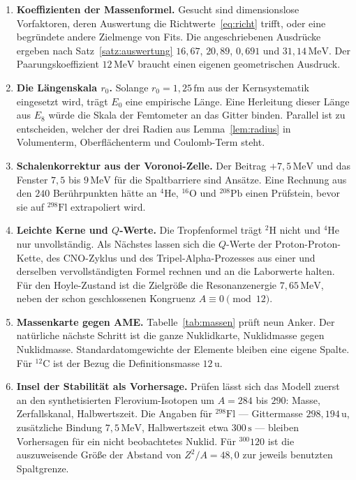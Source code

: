 \documentclass[11pt,a4paper]{article}
\theoremstyle{definition}
\theoremstyle{remark}
\newcommand{\Ee}{E_8}
\begin{document}
\begin{enumerate}
  \item \textbf{Koeffizienten der Massenformel.}
  Gesucht sind dimensionslose Vorfaktoren, deren Auswertung die Richtwerte~\eqref{eq:richt} trifft, oder eine begründete andere Zielmenge von Fits. Die angeschriebenen Ausdrücke ergeben nach Satz~\ref{satz:auswertung} \(16{,}67\), \(20{,}89\), \(0{,}691\) und \(31{,}14\,\mathrm{MeV}\). Der Paarungskoeffizient \(12\,\mathrm{MeV}\) braucht einen eigenen geometrischen Ausdruck.

  \item \textbf{Die Längenskala \(r_0\).}
  Solange \(r_0=1{,}25\,\mathrm{fm}\) aus der Kernsystematik eingesetzt wird, trägt \(E_0\) eine empirische Länge. Eine Herleitung dieser Länge aus \(\Ee\) würde die Skala der Femtometer an das Gitter binden. Parallel ist zu entscheiden, welcher der drei Radien aus Lemma~\ref{lem:radius} in Volumenterm, Oberflächenterm und Coulomb-Term steht.

  \item \textbf{Schalenkorrektur aus der Voronoi-Zelle.}
  Der Beitrag \(+7{,}5\,\mathrm{MeV}\) und das Fenster \(7{,}5\) bis \(9\,\mathrm{MeV}\) für die Spaltbarriere sind Ansätze. Eine Rechnung aus den \(240\) Berührpunkten hätte an \(^{4}\mathrm{He}\), \(^{16}\mathrm{O}\) und \(^{208}\mathrm{Pb}\) einen Prüfstein, bevor sie auf \(^{298}\mathrm{Fl}\) extrapoliert wird.

  \item \textbf{Leichte Kerne und \(Q\)-Werte.}
  Die Tropfenformel trägt \(^{2}\mathrm{H}\) nicht und \(^{4}\mathrm{He}\) nur unvollständig. Als Nächstes lassen sich die \(Q\)-Werte der Proton-Proton-Kette, des CNO-Zyklus und des Tripel-Alpha-Prozesses aus einer und derselben vervollständigten Formel rechnen und an die Laborwerte halten. Für den Hoyle-Zustand ist die Zielgröße die Resonanzenergie \(7{,}65\,\mathrm{MeV}\), neben der schon geschlossenen Kongruenz \(A\equiv 0\pmod{12}\).

  \item \textbf{Massenkarte gegen AME.}
  Tabelle~\ref{tab:massen} prüft neun Anker. Der natürliche nächste Schritt ist die ganze Nuklidkarte, Nuklidmasse gegen Nuklidmasse. Standardatomgewichte der Elemente bleiben eine eigene Spalte. Für \(^{12}\mathrm{C}\) ist der Bezug die Definitionsmasse \(12\,\mathrm{u}\).

  \item \textbf{Insel der Stabilität als Vorhersage.}
  Prüfen lässt sich das Modell zuerst an den synthetisierten Flerovium-Isotopen um \(A=284\) bis \(290\): Masse, Zerfallskanal, Halbwertszeit. Die Angaben für \(^{298}\mathrm{Fl}\) --- Gittermasse \(298{,}194\,\mathrm{u}\), zusätzliche Bindung \(7{,}5\,\mathrm{MeV}\), Halbwertszeit etwa \(300\,\mathrm{s}\) --- bleiben Vorhersagen für ein nicht beobachtetes Nuklid. Für \(^{300}120\) ist die auszuweisende Größe der Abstand von \(Z^2/A=48{,}0\) zur jeweils benutzten Spaltgrenze.


\end{enumerate}
\end{document}

